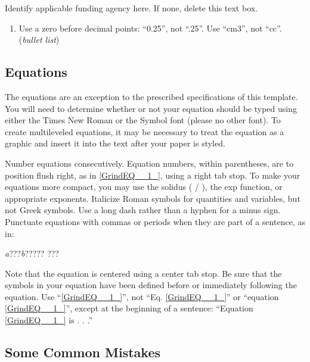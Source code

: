 \documentclass{article} %
\begin{document}
Identify applicable funding agency here. If none, delete this text box.

\begin{enumerate}
\item  Use a zero before decimal points: ``0.25'', not ``.25''. Use ``cm3'', not ``cc''. (\textit{bullet list})
\end{enumerate}


\subsection{ Equations}

The equations are an exception to the prescribed specifications of this template. You will need to determine whether or not your equation should be typed using either the Times New Roman or the Symbol font (please no other font). To create multileveled equations, it may be necessary to treat the equation as a graphic and insert it into the text after your paper is styled.

Number equations consecutively. Equation numbers, within parentheses, are to position flush right, as in \eqref{GrindEQ__1_}, using a right tab stop. To make your equations more compact, you may use the solidus ( / ), the exp function, or appropriate exponents. Italicize Roman symbols for quantities and variables, but not Greek symbols. Use a long dash rather than a hyphen for a minus sign. Punctuate equations with commas or periods when they are part of a sentence, as in:

 \textit{a}???\textit{b}????? ???

Note that the equation is centered using a center tab stop. Be sure that the symbols in your equation have been defined before or immediately following the equation. Use ``\eqref{GrindEQ__1_}'', not ``Eq. \eqref{GrindEQ__1_}'' or ``equation \eqref{GrindEQ__1_}'', except at the beginning of a sentence: ``Equation \eqref{GrindEQ__1_} is . . .''


\subsection{ Some Common Mistakes}
\end{document}
